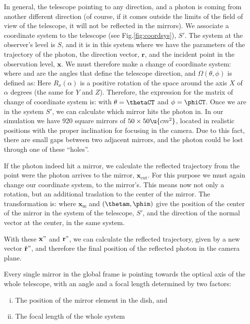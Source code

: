 In general, the telescope pointing to any direction, and a photon is
coming from another different direction (of course, if it comes
outside the limits of the field of view of the telescope, it will not
be reflected in the mirrors). We associate a coordinate system to the
telescope (see Fig.\ref{fig:coordsys}), $S'$. The system at the
observer's level is $S$, and it is in this system where we have the
parameters of the trajectory of the photon, the direction vector,
$\mathbf{r}$, and the incident point in the observation level,
$\mathbf{x}$. We must therefore make a change of coordinate system:
%
\rotateAeq
%
where \thetaCT and \phiCT are the angles that define the telescope
direction, and $\Omega(\theta,\phi)$ is defined as:
%
\omegaAeq
%
Here $R_x(\alpha)$ is a positive rotation of the space around the axis
$X$ of $\alpha$ degrees (the same for $Y$ and $Z$). Therefore, the
expression for the matrix of change of coordinate system is:
%
\transformAeq
%
with $\theta=\thetaCT$ and $\phi=\phiCT$. Once we are in the system
$S'$, we can calculate which mirror hits the photon in. In our
simulation we have 920 square mirrors of $50\times 50\u{cm^2}$,
located in realistic positions with the proper inclination for
focusing in the camera. Due to this fact, there are small gaps between
two adjacent mirrors, and the photon could be lost through one of
these ``holes''.

If the photon indeed hit a mirror, we calculate the reflected
trajectory from the point were the photon arrives to the mirror,
$\mathbf{x}_{\mathrm{cut}}$. For this purpose we must again change our
coordinate system, to the mirror's. This means now not only a
rotation, but an additional traslation to the center of the mirror.
The transformation is:
%
\transformBeq
%
where $\mathbf{x}_{\mathrm{m}}$ and $(\thetam,\phim)$ give the
position of the center of the mirror in the system of the telescope,
$S'$, and the direction of the normal vector at the center, in the
same system.

With these $\mathbf{x}"$ and $\mathbf{r}"$, we can calculate the
reflected trajectory, given by a new vector $\hat{\mathbf{r}}"$, and
therefore the final position of the reflected photon in the camera
plane.

\medskip

Every single mirror in the global frame is pointing towards the
optical axis of the whole telescope, with an angle and a focal length
determined by two factors:

\begin{enumerate}[i.]
\item The position of the mirror element in the dish, and
\item The focal length of the whole system
\end{enumerate}

